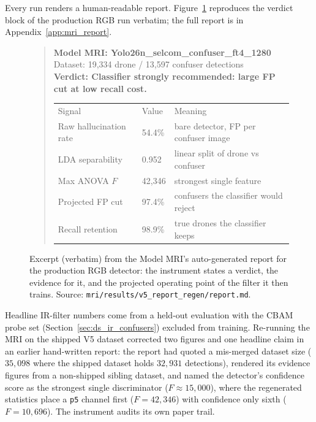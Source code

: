 Every run renders a human-readable report. Figure~\ref{fig:mri_report} reproduces the verdict block of the production RGB run verbatim; the full report is in Appendix~\ref{app:mri_report}.

\begin{figure}[htbp]
\begin{quote}\small\ttfamily
\textbf{Model MRI: Yolo26n\_selcom\_confuser\_ft4\_1280}\\[2pt]
Dataset: 19{,}334 drone / 13{,}597 confuser detections\\[4pt]
\textbf{Verdict: Classifier strongly recommended: large FP cut at low recall cost.}\\[4pt]
\begin{tabular}{@{}lll@{}}
Signal & Value & Meaning \\
Raw hallucination rate & 54.4\% & bare detector, FP per confuser image \\
LDA separability & 0.952 & linear split of drone vs confuser \\
Max ANOVA $F$ & 42{,}346 & strongest single feature \\
Projected FP cut & 97.4\% & confusers the classifier would reject \\
Recall retention & 98.9\% & true drones the classifier keeps \\
\end{tabular}
\end{quote}
\caption{Excerpt (verbatim) from the Model MRI's auto-generated report for the production RGB detector: the instrument states a verdict, the evidence for it, and the projected operating point of the filter it then trains. Source: \texttt{mri/results/v5\_report\_regen/report.md}.}
\label{fig:mri_report}
\end{figure}

Headline IR-filter numbers come from a held-out evaluation with the CBAM probe set (Section~\ref{sec:ds_ir_confusers}) excluded from training. Re-running the MRI on the shipped V5 dataset corrected two figures and one headline claim in an earlier hand-written report: the report had quoted a mis-merged dataset size ($35{,}098$ where the shipped dataset holds $32{,}931$ detections), rendered its evidence figures from a non-shipped sibling dataset, and named the detector's confidence score as the strongest single discriminator ($F\approx 15{,}000$), where the regenerated statistics place a \texttt{p5} channel first ($F = 42{,}346$) with confidence only sixth ($F = 10{,}696$). The instrument audits its own paper trail.
